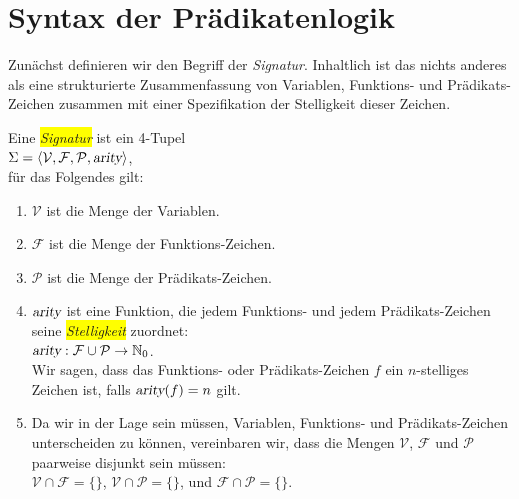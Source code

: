 \section{Syntax der Pr\"{a}dikatenlogik}
Zun\"{a}chst definieren wir den Begriff der \emph{Signatur}.  Inhaltlich ist das nichts anderes als eine 
strukturierte Zusammenfassung von Variablen, Funktions- und Pr\"{a}dikats-Zeichen zusammen mit
einer Spezifikation der Stelligkeit dieser Zeichen.
 
\begin{Definition}[Signatur]
  Eine \colorbox{yellow}{\emph{Signatur}} ist ein 4-Tupel \\[0.2cm]
  \hspace*{1.3cm} $\Sigma = \langle \mathcal{V}, \mathcal{F}, \mathcal{P}, \textsl{arity} \rangle$, \\[0.2cm]
  f\"{u}r das Folgendes gilt: 
  \begin{enumerate}
  \item $\mathcal{V}$ ist die Menge der Variablen.
  \item $\mathcal{F}$ ist die Menge der Funktions-Zeichen.
  \item $\mathcal{P}$ ist die Menge der Pr\"{a}dikats-Zeichen.
  \item $\textsl{arity}$ ist eine Funktion, die jedem Funktions- und jedem Pr\"{a}dikats-Zeichen seine
        \colorbox{yellow}{\emph{Stelligkeit}} zuordnet: \\[0.2cm]
        \hspace*{1.3cm} $\textsl{arity}: \mathcal{F} \cup \mathcal{P} \rightarrow \mathbb{N}_0$. \\[0.2cm]
        Wir sagen, dass das Funktions- oder Pr\"{a}dikats-Zeichen $f$ ein
        $n$-stelliges Zeichen ist, falls $\textsl{arity}(f) = n$ gilt.
  \item Da wir in der Lage sein m\"{u}ssen, Variablen, Funktions- und Pr\"{a}dikats-Zeichen
        unterscheiden zu k\"{o}nnen, vereinbaren wir, dass die Mengen $\mathcal{V}$,
        $\mathcal{F}$ und $\mathcal{P}$ paarweise disjunkt sein m\"{u}ssen: \\[0.2cm] 
        \hspace*{1.3cm} $\mathcal{V} \cap \mathcal{F} = \{\}$, \quad
                        $\mathcal{V} \cap \mathcal{P} = \{\}$, \quad und \quad
                        $\mathcal{F} \cap \mathcal{P} = \{\}$. \eox
  \end{enumerate}
\end{Definition}

